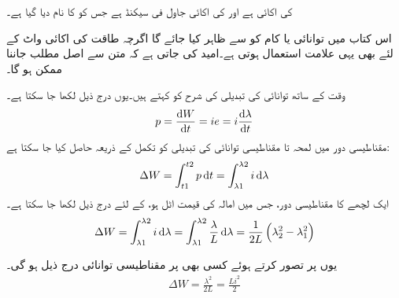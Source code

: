   کی اکائی   ہے اور   کی اکائی جاول فی سیکنڈ ہے جس کو   کا نام دیا گیا  ہے۔

اس کتاب میں توانائی یا کام کو  سے ظاہر کیا جائے گا اگرچہ طاقت کی اکائی واٹ  کے لئے بھی یہی علامت استعمال ہوتی ہے۔امید کی جاتی ہے کہ متن سے  اصل مطلب جاننا ممکن ہو گا۔

وقت  کے ساتھ توانائی  کی تبدیلی کی شرح کو   کہتے ہیں۔یوں درج ذیل لکھا جا سکتا ہے۔
\begin{align}
p=\frac{\dif W}{\dif t} = ie = i \frac{\dif \lambda}{\dif t}
\end{align} 
مقناطیسی دور میں  لمحہ  تا   مقناطیسی توانائی کی تبدیلی کو تکمل کے ذریعہ حاصل کیا جا سکتا ہے:
\begin{align}
\Delta W = \int_{t1}^{t2} p \dif t =\int_{\lambda1}^{\lambda2} i \dif \lambda
\end{align}
ایک لچھے کا مقناطیسی دور، جس میں  امالہ کی قیمت اٹل ہو، کے لئے درج ذیل لکھا جا سکتا ہے۔
\begin{align}
\Delta W = \int_{\lambda1}^{\lambda2} i \dif \lambda=\int_{\lambda1}^{\lambda2} \frac{\lambda}{L} \dif \lambda=\frac{1}{2 L} \left(\lambda_2^2-\lambda_1^2 \right)
\end{align}

یوں  پر  تصور کرتے ہوئے  کسی بھی  پر مقناطیسی توانائی درج ذیل ہو گی۔
\begin{align}
\Delta W=\frac{\lambda^2}{2L}=\frac{L i^2}{2}
\end{align}


